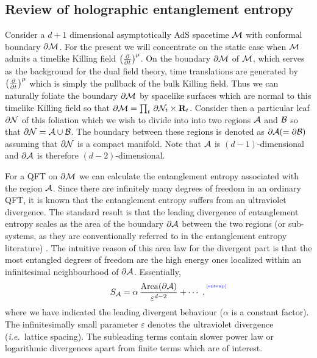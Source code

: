 \documentclass[12pt]{article}
\def\({\left (}
\def\){\right )}
\def\ie{{\it i.e.}}
\def\a{\alpha}
\def\veps{\varepsilon}
\def\p{\partial}
\def\CA{{\cal A}}
\def\CB{{\cal B}}
\def\R{{\bf R}}
\def\p{\partial}
\def\p{\partial}
\def\Label#1{\label{#1}%
{ \color{blue}{\smash{\hbox to0pt{\raise2ex\hbox{\tiny[#1]}\hss}}}}}
\def\bulk{{\cal M}}
\def\bdy{\p{\cal M}}
\def\bdys{\p{\cal N}}
\def\rA{\CA}
\def\rB{\CB}
\def\brA{\p \CA}
\def\area#1{{\rm Area}(#1)}
\def\ptm{\({\p \over \p t}\)^\mu}
\def\cof{{\veps}}
\def\de{\partial}
\def\ap{\alpha}
\begin{document}
\subsection{Review of holographic entanglement entropy}
\label{minsurTT}

Consider a $d+1$ dimensional asymptotically AdS spacetime $\bulk$ with conformal
boundary $\bdy$. For the present we will concentrate on the static case when $\bulk$ admits
 a timelike Killing field $\ptm$. On the boundary $\bdy$  of $\bulk$, which serves as the
 background for the dual field theory,  time translations are generated by $\ptm$ which is
 simply the pullback of the bulk Killing field. Thus we can naturally foliate the boundary $\bdy$
 by spacelike surfaces which are normal to this  timelike Killing field so that
 $\bdy = \prod_t\, \bdys_t \times \R_t$. Consider then  a particular leaf $\bdys$ of
 this foliation which we wish to divide into into two regions $\rA$ and $\rB$ so that
  $\bdys = \rA \cup \rB$.  The boundary between these regions is denoted as $\brA(=\de{\cal  B})$
  assuming that $\bdys$ is a compact manifold.  Note that $\rA$ is $(d-1)$-dimensional and $\brA$
  is therefore $(d-2)$-dimensional.

For a QFT on $\bdy$ we can calculate the entanglement entropy
associated with the region $\rA$. Since there are infinitely many
degrees of freedom in an ordinary QFT, it is known that the
entanglement entropy suffers from an ultraviolet divergence. The
standard result is that the leading divergence of entanglement
entropy scales as the area of the boundary $\brA$ between the two
regions (or sub-systems, as they are conventionally referred to in
the entanglement entropy literature)
\cite{Bombelli:1986rw,Srednicki:1993im}. The intuitive reason of
this area law for the divergent part is that the most entangled
degrees of freedom are the high energy ones localized within an
infinitesimal neighbourhood of $\brA$.
  Essentially,
%
\begin{equation}
S_\rA = \a \, {\area{\brA} \over \cof^{d-2} } + \cdots \ ,
\Label{entexp}
\end{equation}
%
where we have indicated the leading divergent behaviour ($\ap$ is a
constant factor). The infinitesimally small parameter $\cof$ denotes
the ultraviolet divergence (\ie\ lattice spacing). The subleading
terms contain slower power law or logarithmic divergences apart from
finite terms which are of interest.
\end{document}
